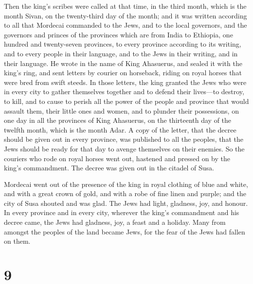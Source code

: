  Then the king's scribes were called at that time, in the
third month, which is the month Sivan, on the twenty-third day of the
month; and it was written according to all that Mordecai commanded to
the Jews, and to the local governors, and the governors and princes of
the provinces which are from India to Ethiopia, one hundred and
twenty-seven provinces, to every province according to its writing, and
to every people in their language, and to the Jews in their writing, and
in their language.  He wrote in the name of King Ahasuerus,
and sealed it with the king's ring, and sent letters by courier on
horseback, riding on royal horses that were bred from swift steeds.
 In those letters, the king granted the Jews who were in
every city to gather themselves together and to defend their lives---to
destroy, to kill, and to cause to perish all the power of the people and
province that would assault them, their little ones and women, and to
plunder their possessions,  on one day in all the provinces
of King Ahasuerus, on the thirteenth day of the twelfth month, which is
the month Adar.  A copy of the letter, that the decree
should be given out in every province, was published to all the peoples,
that the Jews should be ready for that day to avenge themselves on their
enemies.  So the couriers who rode on royal horses went
out, hastened and pressed on by the king's commandment. The decree was
given out in the citadel of Susa.

 Mordecai went out of the presence of the king in royal
clothing of blue and white, and with a great crown of gold, and with a
robe of fine linen and purple; and the city of Susa shouted and was
glad.  The Jews had light, gladness, joy, and honour.
 In every province and in every city, wherever the king's
commandment and his decree came, the Jews had gladness, joy, a feast and
a holiday. Many from amongst the peoples of the land became Jews, for
the fear of the Jews had fallen on them.

\hypertarget{section-8}{%
\section{9}\label{section-8}}

